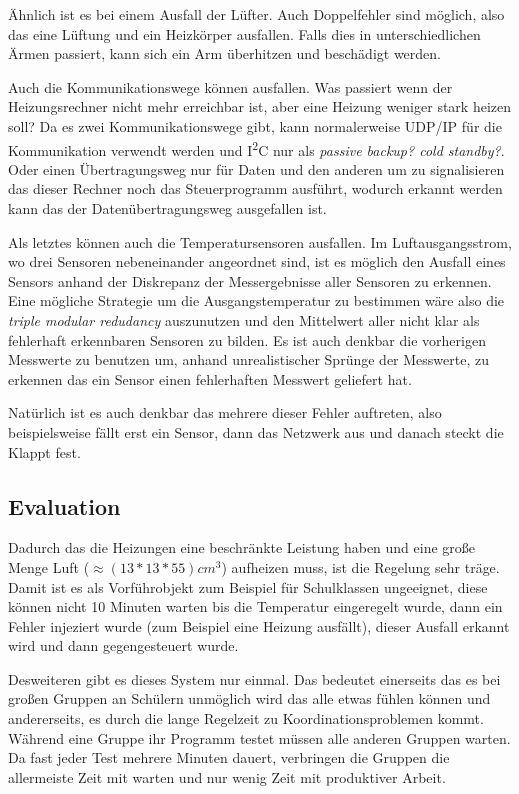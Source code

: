 {\"{A}}hnlich ist es bei einem Ausfall der L{\"{u}}fter. Auch Doppelfehler sind m{\"{o}}glich, also das eine L{\"{u}}ftung und ein Heizk{\"{o}}rper ausfallen. Falls
dies in unterschiedlichen {\"{A}}rmen passiert, kann sich ein Arm {\"{u}}berhitzen und besch{\"{a}}digt werden.

Auch die Kommunikationswege k{\"{o}}nnen ausfallen. Was passiert wenn der Heizungsrechner nicht mehr erreichbar ist, aber eine Heizung weniger stark heizen soll?
Da es zwei Kommunikationswege gibt, kann normalerweise UDP/IP f{\"{u}}r die Kommunikation verwendt werden und I\textsuperscript{2}C nur
als \textit{passive backup? cold standby?}. Oder einen {\"{U}}bertragungsweg nur f{\"{u}}r Daten und den anderen um zu signalisieren das dieser Rechner noch das
Steuerprogramm ausf{\"{u}}hrt, wodurch erkannt werden kann das der Daten{\"{u}}bertragungsweg ausgefallen ist.

Als letztes k{\"{o}}nnen auch die Temperatursensoren ausfallen. Im Luftausgangsstrom, wo drei Sensoren nebeneinander angeordnet sind, ist es m{\"{o}}glich den
Ausfall eines Sensors anhand der Diskrepanz der Messergebnisse aller Sensoren zu erkennen. Eine m{\"{o}}gliche Strategie um die Ausgangstemperatur zu
bestimmen w{\"{a}}re also die \textit{triple modular redudancy} auszunutzen und den Mittelwert aller nicht klar als fehlerhaft erkennbaren Sensoren zu bilden.
Es ist auch denkbar die vorherigen Messwerte zu benutzen um, anhand unrealistischer Spr{\"{u}}nge der Messwerte, zu erkennen das ein Sensor einen fehlerhaften
Messwert geliefert hat.

Nat{\"{u}}rlich ist es auch denkbar das mehrere dieser Fehler auftreten, also beispielsweise f{\"{a}}llt erst ein Sensor, dann das Netzwerk aus und danach
steckt die Klappt fest.

\subsection{Evaluation} Dadurch das die Heizungen eine beschr{\"{a}}nkte Leistung haben und eine gro{\ss}e Menge Luft ($ \approx (13*13*55)cm^3$) aufheizen muss,
ist die Regelung sehr tr{\"{a}}ge. Damit ist es als Vorf{\"{u}}hrobjekt zum Beispiel f{\"{u}}r Schulklassen ungeeignet, diese k{\"{o}}nnen nicht 10 Minuten warten
bis die Temperatur eingeregelt wurde, dann ein Fehler injeziert wurde (zum Beispiel eine Heizung ausf{\"{a}}llt), dieser Ausfall erkannt wird und dann gegengesteuert
wurde.

Desweiteren gibt es dieses System nur einmal. Das bedeutet einerseits das es bei gro{\ss}en Gruppen an Sch{\"{u}}lern unm{\"{o}}glich wird das alle etwas
f{\"{u}}hlen k{\"{o}}nnen und andererseits, es durch die lange Regelzeit zu Koordinationsproblemen kommt. W{\"{a}}hrend eine Gruppe ihr Programm testet m{\"{u}}ssen
alle anderen Gruppen warten. Da fast jeder Test mehrere Minuten dauert, verbringen die Gruppen die allermeiste Zeit mit warten und nur wenig Zeit mit produktiver
Arbeit.

